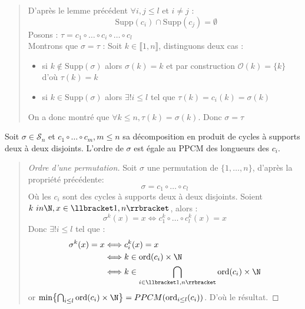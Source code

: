 \begin{quote}
    \begin{footnotesize}
        D'après le lemme précédent $\forall i,j \leq l $ et $ i \not = j $ :
		\[ \boxed{ \text{ Supp}(c_i) \cap \text{Supp}(c_j) = \emptyset } \] 
        {Posons :} $\boxed{ \tau = c_1 \circ \dots \circ c_i \circ \dots \circ c_l }$ \\
        {Montrons que $\sigma = \tau$ :} Soit $k \in \llbracket 1, n \rrbracket $, distinguons deux cas :
        \begin{itemize}
            \item si $k \not \in \text{Supp}(\sigma)$ alors $\sigma(k) = k$ et par construction $\mathcal{O}(k) = \{k\}$ d'où $\tau(k) = k$ 
            \item si $k \in \text{Supp}(\sigma)$ alors $ \exists! i \leq l$ tel que $ \tau(k) = c_i(k) = \sigma(k)$
        \end{itemize}
        On a donc montré que $\forall k \leq n, \tau(k) = \sigma(k)$. Donc $\sigma = \tau$ 
    \end{footnotesize}
\end{quote}

\begin{prop}
		Soit $ \sigma \in \mathcal{S}_n$ et $c_1 \circ \dots \circ c_m, m \leq n $ sa décomposition en produit de cycles à supports deux à deux disjoints.
		L'ordre de $\sigma$ est égale au PPCM des longueurs des $c_i$.
\end{prop}

\begin{quote}
\footnotesize 
\begin{proof}[Ordre d'une permutation]
		Soit $\sigma$ une permutation de $\{1,\dots,n\}$, d'après la propriété précédente:
		\[ \sigma = c_1 \circ \dots \circ c_l \]
		Où les $c_i$ sont des cycles à supports deux à deux disjoints. Soient $k \ in \N, x \in \llbracket 1, n \rrbracket$, alors :
			\[ \sigma^k (x) = x \Leftrightarrow c_1^k \circ \dots \circ c_l^k(x) = x \]
		Donc $ \exists! i \leq l $ tel que :
		\begin{align*}
			\sigma^k (x) = x & \Longleftrightarrow c_i^k(x) = x \\
						& \Longleftrightarrow k \in \text{ord}(c_i) \times \N \\
						& \Longleftrightarrow k \in \bigcap_{i \in \llbracket 1, n \rrbracket} \text{ord}(c_i) \times \N 
		\end{align*}
		or $ \min \bigl\{ \bigcap_{i \leq l} \text{ord}(c_i) \times \N \bigr\} = PPCM(\text{ord}_{i \leq l}(c_i))$.
		D'où le résultat.
\end{proof}
\normalsize
\end{quote}

